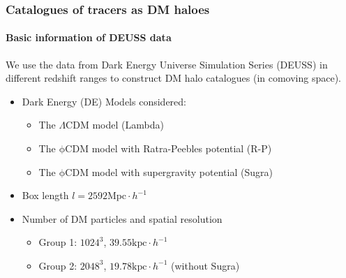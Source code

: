 \documentclass{beamer}
\newtheorem{Narrow down the analysis}{Narrow down the analysis}
\begin{document}
\begin{frame}
	\frametitle{Catalogues of tracers as DM haloes}
	\framesubtitle{Basic information of DEUSS data}
	\pause We use the data from Dark Energy Universe Simulation Series (DEUSS) in different redshift ranges \citep{Rasera2010} to construct DM halo catalogues (in comoving space).
	\begin{itemize}
	\pause \item Dark Energy (DE) Models considered:
		\begin{itemize}
		\pause \item The $\Lambda\mathrm{CDM}$ model (Lambda)
		\pause \item The $\mathrm{\phi CDM}$ model with Ratra-Peebles potential (R-P) 
		\pause \item The $\mathrm{\phi CDM}$ model with supergravity potential (Sugra)
		\end{itemize}
	\pause \item Box length $l=2592\mathrm{Mpc}\cdot h^{-1}$
	\pause \item Number of DM particles and spatial resolution
		\begin{itemize}
		\item Group 1: $1024^{3}$, $39.55\mathrm{kpc}\cdot h^{-1}$
		\item Group 2: $2048^{3}$, $19.78\mathrm{kpc}\cdot h^{-1}$ (without Sugra)
		\end{itemize}
	\end{itemize}
\end{frame}
\end{document}

